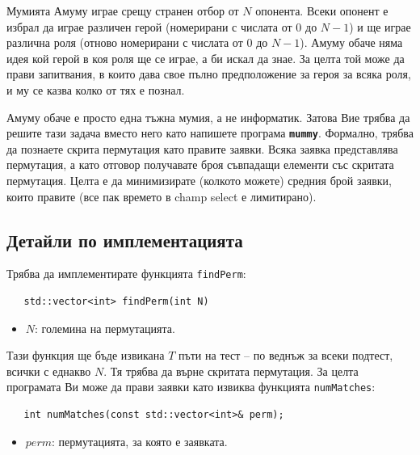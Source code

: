 \documentclass[12pt]{article}
\begin{document}
\renewcommand{\tl}{$3$ сек.}
\renewcommand{\ml}{$1024$ MB}
\renewcommand{\header}{
	НАЦИОНАЛЕН ЕСЕНЕН ТУРНИР ПО ИНФОРМАТИКА\\
	София, 21 – 23 ноември 2025 г.\\
	Група A – 11, 12 клас
}

Мумията Амуму играе срещу странен отбор от $N$ опонента. Всеки опонент е избрал да играе различен герой (номерирани с числата от $0$ до $N-1$) и ще играе различна роля (отново номерирани с  числата от $0$ до $N-1$). Амуму обаче няма идея кой герой в коя роля ще се играе, а би искал да знае. За целта той може да прави запитвания, в които дава свое пълно предположение за героя за всяка роля, и му се казва колко от тях е познал. 

Амуму обаче е просто една тъжна мумия, а не информатик. Затова Вие трябва да решите тази задача вместо него като напишете програма \textbf{\texttt{mummy}}. Формално, трябва да познаете скрита пермутация като правите заявки. Всяка заявка представлява пермутация, а като отговор получавате броя съвпадащи елементи със скритата пермутация. Целта е да минимизирате (колкото можете) средния брой заявки, които правите (все пак времето в champ select е лимитирано).

\subsection{Детайли по имплементацията}
Трябва да имплементирате функцията \texttt{findPerm}:
\begin{lstlisting}
   std::vector<int> findPerm(int N)
\end{lstlisting}
\begin{itemize}
	\item $N$: големина на пермутацията.
\end{itemize}

Тази функция ще бъде извикана $T$ пъти на тест -- по веднъж за всеки подтест, всички с еднакво $N$. Тя трябва да върне скритата пермутация. За целта програмата Ви може да прави заявки като извиква функцията \texttt{numMatches}:
\begin{lstlisting}
   int numMatches(const std::vector<int>& perm);
\end{lstlisting}
\begin{itemize}
	\item $perm$: пермутацията, за която е заявката.
\end{itemize}
\end{document}
